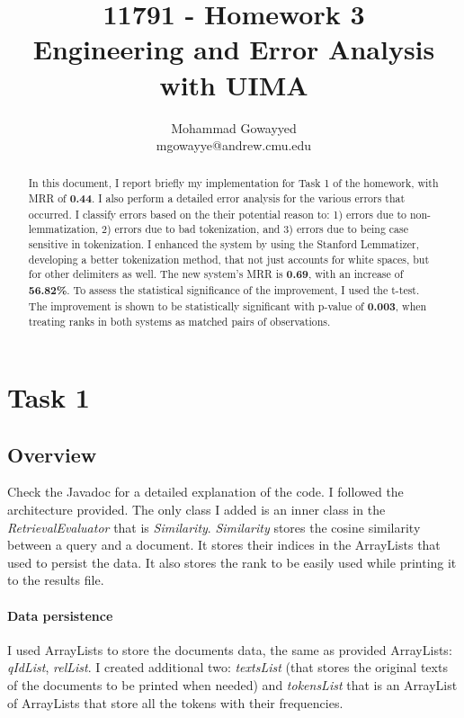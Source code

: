 \documentclass{article}
\begin{document}
\title{11791 - Homework 3\\Engineering and Error Analysis with UIMA}
\author{Mohammad Gowayyed \\ mgowayye@andrew.cmu.edu}

\maketitle
\begin{abstract}
In this document, I report briefly my implementation for Task 1 of the homework, with MRR of \textbf{0.44}. I also perform a detailed error analysis for the various errors that occurred. I classify errors based on the their potential reason to: 1) errors due to non-lemmatization, 2) errors due to bad tokenization, and 3) errors due to being case sensitive in tokenization. I enhanced the system by using the Stanford Lemmatizer, developing a better tokenization method, that not just accounts for white spaces, but for other delimiters as well. The new system's MRR is \textbf{0.69}, with an increase of \textbf{56.82\%}. To assess the statistical significance of the improvement, I used the t-test. The improvement is shown to be statistically significant with p-value of \textbf{0.003}, when treating ranks in both systems as matched pairs of observations.
\end{abstract}


\section{Task 1}

\subsection{Overview}
 
Check the Javadoc for a detailed explanation of the code. I followed the architecture provided. The only class I added is an inner class in the \textit{RetrievalEvaluator} that is \textit{Similarity}. \textit{Similarity} stores the cosine similarity between a query and a document. It stores their indices in the ArrayLists that used to persist the data. It also stores the rank to be easily used while printing it to the results file.

\paragraph{Data persistence} I used ArrayLists to store the documents data, the same as provided ArrayLists: \textit{qIdList}, \textit{relList}. I created additional two: \textit{textsList} (that stores the original texts of the documents to be printed when needed) and \textit{tokensList} that is an ArrayList of ArrayLists that store all the tokens with their frequencies.
\end{document}
